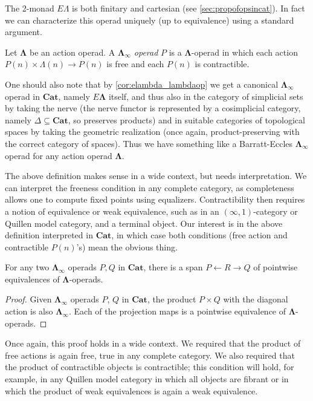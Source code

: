 \documentclass{amsbook} %
\newcommand{\mb}{\mathbf}
\numberwithin{section}{chapter}
\begin{document}
The 2-monad $E\Lambda$ is both finitary and cartesian (see \cref{sec:propofopsincat}).  In fact we can characterize this operad uniquely (up to equivalence) using a standard argument.

\begin{Defi}
Let $\mb{\Lambda}$ be an action operad.  A \textit{$\mb{\Lambda}_{\infty}$ operad} $P$ is a $\mb{\Lambda}$-operad in which each action $P(n) \times \Lambda(n) \rightarrow P(n)$ is free and each $P(n)$ is contractible.
\end{Defi}

\begin{rem}
One should also note that by \cref{cor:elambda_lambdaop} we get a canonical $\mb{\Lambda}_{\infty}$ operad in $\mb{Cat}$, namely $E \mb{\Lambda}$ itself, and thus also in the category of simplicial sets by taking the nerve (the nerve functor is represented by a cosimplicial category, namely $\Delta \subseteq \mb{Cat}$, so preserves products) and in suitable categories of topological spaces by taking the geometric realization (once again, product-preserving with the correct category of spaces).  Thus we have something like a Barratt-Eccles $\mb{\Lambda}_{\infty}$ operad for any action operad $\mb{\Lambda}$.
\end{rem}

\begin{rem}
The above definition makes sense in a wide context, but needs interpretation.  We can interpret the freeness condition in any complete category, as completeness allows one to compute fixed points using equalizers.  Contractibility then requires a notion of equivalence or weak equivalence, such as in an $(\infty, 1)$-category or Quillen model category, and a terminal object.  Our interest is in the above definition interpreted in $\mb{Cat}$, in which case both conditions (free action and contractible $P(n)$'s) mean the obvious thing.
\end{rem}

\begin{prop}
For any two $\mb{\Lambda}_{\infty}$ operads $P,Q$ in $\mb{Cat}$, there is a span $P \leftarrow R \rightarrow Q$  of pointwise equivalences of $\mb{\Lambda}$-operads.
\end{prop}
\begin{proof}
Given $\mb{\Lambda}_{\infty}$ operads $P$, $Q$ in $\mb{Cat}$, the product $P \times Q$ with the diagonal action is also $\mb{\Lambda}_{\infty}$.  Each of the projection maps is a pointwise equivalence of $\mb{\Lambda}$-operads.
\end{proof}
\begin{rem}
Once again, this proof holds in a wide context.  We required that the product of free actions is again free, true in any complete category.  We also required that the product of contractible objects is contractible; this condition will hold, for example, in any Quillen model category in which all objects are fibrant or in which the product of weak equivalences is again a weak equivalence.
\end{rem}
\end{document}
